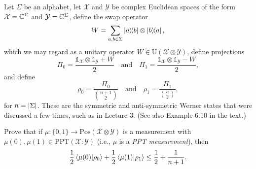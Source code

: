 \documentclass[boxes,pages,color=SeaGreen]{homework}
\newcommand{\X}{\mathcal{X}}
\newcommand{\Y}{\mathcal{Y}}
\newcommand{\I}{\mathbb{1}}
\newcommand{\Pos}{\mathrm{Pos}}
\newcommand{\Unitary}{\mathrm{U}}
\newcommand{\PPT}{\mathrm{PPT}}
\begin{document}
\begin{problem}
Let $\Sigma$ be an alphabet, let $\X$ and $\Y$ be complex Euclidean spaces of
the form $\X = \C^{\Sigma}$ and $\Y = \C^{\Sigma}$, define the
swap operator
\[
  W = \sum_{a,b\in\Sigma} \ketbra{a}{b} \otimes \ketbra{b}{a},
\]
which we may regard as a unitary operator $W\in\Unitary(\X\otimes\Y)$,
define projections
\[
  \Pi_0 = \frac{\I_{\X} \otimes \I_{\Y} + W}{2}
  \quad\text{and}\quad
  \Pi_1 = \frac{\I_{\X} \otimes \I_{\Y} - W}{2},
\]
and define
\[
  \rho_0 = \frac{\Pi_0}{\binom{n+1}{2}}
  \quad\text{and}\quad
  \rho_1 = \frac{\Pi_1}{\binom{n}{2}},
\]
for $n = \abs{\Sigma}$.
These are the symmetric and anti-symmetric Werner states that were discussed
a few times, such as in Lecture 3.
(See also Example 6.10 in the text.)

Prove that if $\mu: \{0,1\} \rightarrow \Pos(\X\otimes\Y)$ is a measurement with
$\mu(0), \mu(1) \in \PPT(\X \mathbin{:} \Y)$ (i.e., $\mu$ is a
\emph{PPT measurement}), then
\[
  \frac{1}{2}\ip{\mu(0)}{\rho_0} + \frac{1}{2}\ip{\mu(1)}{\rho_1}
  \leq \frac{1}{2} + \frac{1}{n+1}.
\]
\end{problem}
\end{document}
